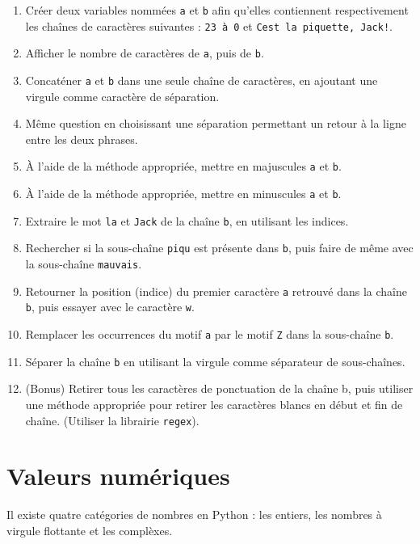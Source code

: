 \documentclass[12pt,]{book}
\providecommand{\tightlist}{%
  \setlength{\itemsep}{0pt}\setlength{\parskip}{0pt}}
\numberwithin{equation}{section}
\numberwithin{countremarque}{section}
\let\BeginKnitrBlock\begin \let\EndKnitrBlock\end
\begin{document}
\BeginKnitrBlock{exframe}
\begin{enumerate}
\def\labelenumi{\arabic{enumi}.}
\tightlist
\item
  Créer deux variables nommées \texttt{a} et \texttt{b} afin qu'elles
  contiennent respectivement les chaînes de caractères suivantes :
  \texttt{23\ à\ 0} et
  \texttt{C\textquotesingle{}est\ la\ piquette,\ Jack!}.
\item
  Afficher le nombre de caractères de \texttt{a}, puis de \texttt{b}.
\item
  Concaténer \texttt{a} et \texttt{b} dans une seule chaîne de
  caractères, en ajoutant une virgule comme caractère de séparation.
\item
  Même question en choisissant une séparation permettant un retour à la
  ligne entre les deux phrases.
\item
  À l'aide de la méthode appropriée, mettre en majuscules \texttt{a} et
  \texttt{b}.
\item
  À l'aide de la méthode appropriée, mettre en minuscules \texttt{a} et
  \texttt{b}.
\item
  Extraire le mot \texttt{la} et \texttt{Jack} de la chaîne \texttt{b},
  en utilisant les indices.
\item
  Rechercher si la sous-chaîne \texttt{piqu} est présente dans
  \texttt{b}, puis faire de même avec la sous-chaîne \texttt{mauvais}.
\item
  Retourner la position (indice) du premier caractère \texttt{a}
  retrouvé dans la chaîne \texttt{b}, puis essayer avec le caractère
  \texttt{w}.
\item
  Remplacer les occurrences du motif \texttt{a} par le motif \texttt{Z}
  dans la sous-chaîne \texttt{b}.
\item
  Séparer la chaîne \texttt{b} en utilisant la virgule comme séparateur
  de sous-chaînes.
\item
  (Bonus) Retirer tous les caractères de ponctuation de la chaîne b,
  puis utiliser une méthode appropriée pour retirer les caractères
  blancs en début et fin de chaîne. (Utiliser la librairie
  \texttt{regex}).
\end{enumerate}
\EndKnitrBlock{exframe}

\section{Valeurs numériques}\label{valeurs-numeriques}

Il existe quatre catégories de nombres en Python : les entiers, les
nombres à virgule flottante et les complèxes.
\end{document}
